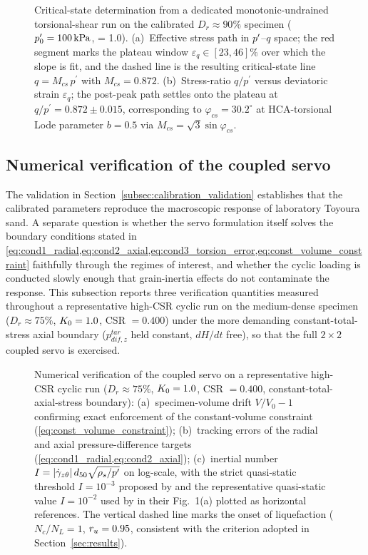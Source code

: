 \begin{figure}[t]
  \centering
  \caption{Critical-state determination from a dedicated monotonic-undrained torsional-shear run on the calibrated $D_r \approx 90\%$ specimen ($p^\prime_0 = \SI{100}{kPa}$, \Kzero{} = 1.0). (a)~Effective stress path in $p^\prime$--$q$ space; the red segment marks the plateau window $\varepsilon_q \in [23, 46]\%$ over which the slope is fit, and the dashed line is the resulting critical-state line $q = M_{cs}\,p^{\prime}$ with $M_{cs} = 0.872$. (b)~Stress-ratio $q/p^{\prime}$ versus deviatoric strain $\varepsilon_q$; the post-peak path settles onto the plateau at $q/p^{\prime} = 0.872 \pm 0.015$, corresponding to $\varphi_{cs} = 30.2^{\circ}$ at HCA-torsional Lode parameter $b = 0.5$ via $M_{cs} = \sqrt{3}\sin\varphi_{cs}$.}
  \label{fig:csl_determination}
\end{figure}

\subsection{Numerical verification of the coupled servo}
\label{subsec:numerical_verification}

The validation in Section~\ref{subsec:calibration_validation} establishes that the calibrated parameters reproduce the macroscopic response of laboratory Toyoura sand. A separate question is whether the servo formulation itself solves the boundary conditions stated in \cref{eq:cond1_radial,eq:cond2_axial,eq:cond3_torsion_error,eq:const_volume_constraint} faithfully through the regimes of interest, and whether the cyclic loading is conducted slowly enough that grain-inertia effects do not contaminate the response. This subsection reports three verification quantities measured throughout a representative high-CSR cyclic run on the medium-dense specimen ($D_r \approx 75\%$, $K_0{} = 1.0$, CSR $= 0.400$) under the more demanding constant-total-stress axial boundary ($p_{dif,z}^{tar}$ held constant, $dH/dt$ free), so that the full $2\times 2$ coupled servo is exercised.

\begin{figure}[t]
  \centering
  \caption{Numerical verification of the coupled servo on a representative high-CSR cyclic run ($D_r \approx 75\%$, $K_0{} = 1.0$, CSR $= 0.400$, constant-total-axial-stress boundary): (a)~specimen-volume drift $V/V_0 - 1$ confirming exact enforcement of the constant-volume constraint (\cref{eq:const_volume_constraint}); (b)~tracking errors of the radial and axial pressure-difference targets (\cref{eq:cond1_radial,eq:cond2_axial}); (c)~inertial number $I = |\dot\gamma_{z\theta}|\,d_{50}\sqrt{\rho_s/p^\prime}$ on log-scale, with the strict quasi-static threshold $I = 10^{-3}$ proposed by \citet{GDRMiDi2004} and the representative quasi-static value $I = 10^{-2}$ used by \citet{daCruzEmam2005} in their Fig.~1(a) plotted as horizontal references. The vertical dashed line marks the onset of liquefaction ($N_c/N_L = 1$, $r_u = 0.95$, consistent with the criterion adopted in Section~\ref{sec:results}).}
  \label{fig:numerical_verification}
\end{figure}

